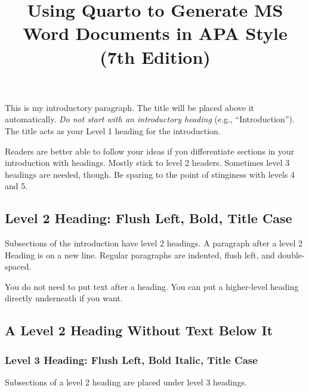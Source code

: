 \documentclass[
  man,
  floatsintext,
  colorlinks=true,linkcolor=blue,citecolor=blue,urlcolor=blue,biblatex]{apa7}
\title{Using Quarto to Generate MS Word Documents in APA Style (7th
Edition)}
\date{}
\begin{document}
\maketitle
\ifdefined\Shaded\renewenvironment{Shaded}{\begin{tcolorbox}[interior hidden, borderline west={3pt}{0pt}{shadecolor}, sharp corners, frame hidden, breakable, enhanced, boxrule=0pt]}{\end{tcolorbox}}\fi
This is my introductory paragraph. The title will be placed above it
automatically. \emph{Do not start with an introductory heading} (e.g.,
``Introduction''). The title acts as your Level 1 heading for the
introduction.

Readers are better able to follow your ideas if you differentiate
sections in your introduction with headings. Mostly stick to level 2
headers. Sometimes level 3 headings are needed, though. Be sparing to
the point of stinginess with levels 4 and 5.

\hypertarget{level-2-heading-flush-left-bold-title-case}{%
\subsection{Level 2 Heading: Flush Left, Bold, Title
Case}\label{level-2-heading-flush-left-bold-title-case}}

Subsections of the introduction have level 2 headings. A paragraph after
a level 2 Heading is on a new line. Regular paragraphs are indented,
flush left, and double-spaced.

You do not need to put text after a heading. You can put a higher-level
heading directly underneath if you want.

\hypertarget{a-level-2-heading-without-text-below-it}{%
\subsection{A Level 2 Heading Without Text Below
It}\label{a-level-2-heading-without-text-below-it}}

\hypertarget{level-3-heading-flush-left-bold-italic-title-case}{%
\subsubsection{Level 3 Heading: Flush Left, Bold Italic, Title
Case}\label{level-3-heading-flush-left-bold-italic-title-case}}

Subsections of a level 2 heading are placed under level 3 headings.
\end{document}
